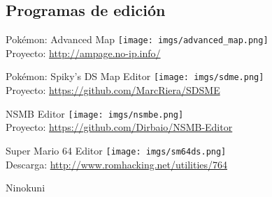 \subsection{Programas de edición}
\begin{frame}{Pokémon: Advanced Map}
    \centering
    \texttt{[image: imgs/advanced\_map.png]} \\
    Proyecto: \url{http://ampage.no-ip.info/}
\end{frame}

\begin{frame}{Pokémon: Spiky's DS Map Editor}
    \centering
    \texttt{[image: imgs/sdme.png]} \\
    Proyecto: \url{https://github.com/MarcRiera/SDSME}
\end{frame}

\begin{frame}{NSMB Editor}
    \centering
    \texttt{[image: imgs/nsmbe.png]} \\
    Proyecto: \url{https://github.com/Dirbaio/NSMB-Editor}
\end{frame}

\begin{frame}{Super Mario 64 Editor}
    \centering
    \texttt{[image: imgs/sm64ds.png]} \\
    Descarga: \url{http://www.romhacking.net/utilities/764}
\end{frame}

\begin{frame}{Ninokuni}

\end{frame}
